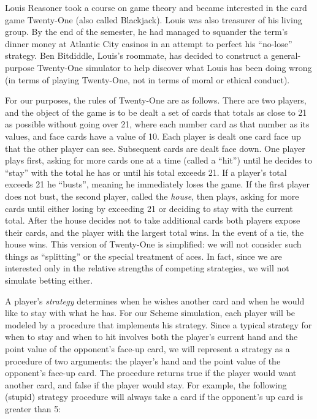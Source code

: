 





Louis Reasoner took a course on game theory and became interested in
the card game Twenty-One (also called Blackjack).  Louis was also
treasurer of his living group.  By the end of the semester, he had
managed to squander the term's dinner money at Atlantic City casinos
in an attempt to perfect his ``no-lose'' strategy.  Ben Bitdiddle,
Louis's roommate, has decided to construct a general-purpose
Twenty-One simulator to help discover what Louis has been doing wrong
(in terms of playing Twenty-One, not in terms of moral or ethical conduct).

For our purposes, the rules of Twenty-One are as follows.  There are
two players, and the object of the game is to be dealt a set of cards
that totals as close to 21 as possible without going over 21, where
each number card as that number as its values, and face cards have a
value of 10.  Each
player is dealt one card face up that the other player can see.
Subsequent cards are dealt face down.  One player plays first, asking
for more cards one at a time (called a ``hit'') until he decides to
``stay'' with the total he has or until his total exceeds 21.  If a
player's total exceeds 21 he ``busts'', meaning he immediately loses
the game.  If the first player does not bust, the second player,
called the {\it house}, then plays, asking for more cards until either
losing by exceeding 21 or deciding to stay with the current total.
After the house decides not to take additional cards both players
expose their cards, and the player with the largest total wins.  In
the event of a tie, the house wins.  This version of Twenty-One is
simplified: we will not consider such things as ``splitting'' or the
special treatment of aces. In fact, since we are interested only in
the relative strengths of competing strategies, we will not simulate
betting either.

A player's {\it strategy} determines when he wishes another card and
when he would like to stay with what he has.  For our Scheme
simulation, each player will be modeled by a procedure that implements
his strategy.  Since a typical strategy for when to stay and when to
hit involves both the player's current hand and the point value of the
opponent's face-up card, we will represent a strategy as a procedure
of two arguments: the player's hand and the point value of the
opponent's face-up card.  The procedure returns true if the player
would want another card, and false if the player would stay.  For
example, the following (stupid) strategy procedure will always take a
card if the opponent's up card is greater than 5:

